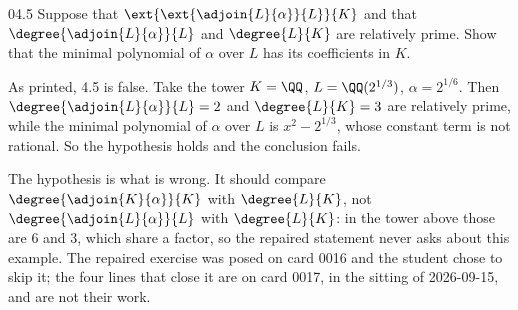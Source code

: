 \documentclass[11pt]{article}
\begin{document}
\begin{problem}{04.5}
  Suppose that $\ext{\ext{\adjoin{L}{\alpha}}{L}}{K}$ and that
  $\degree{\adjoin{L}{\alpha}}{L}$ and $\degree{L}{K}$ are relatively prime.
  Show that the minimal polynomial of $\alpha$ over $L$ has its coefficients
  in $K$.
\end{problem}

\begin{solution}
  As printed, 4.5 is false. Take the tower $K = \QQ$, $L = \QQ(2^{1/3})$,
  $\alpha = 2^{1/6}$. Then $\degree{\adjoin{L}{\alpha}}{L} = 2$ and
  $\degree{L}{K} = 3$ are relatively prime, while the minimal polynomial of
  $\alpha$ over $L$ is $x^{2} - 2^{1/3}$, whose constant term is not rational.
  So the hypothesis holds and the conclusion fails.
\end{solution}

\begin{remark}
  The hypothesis is what is wrong. It should compare $\degree{\adjoin{K}{\alpha}}{K}$
  with $\degree{L}{K}$, not $\degree{\adjoin{L}{\alpha}}{L}$ with
  $\degree{L}{K}$: in the tower above those are $6$ and $3$, which share a
  factor, so the repaired statement never asks about this example. The repaired
  exercise was posed on card 0016 and the student chose to skip it; the four
  lines that close it are on card 0017, in the sitting of 2026-09-15, and are
  not their work.
\end{remark}
\end{document}
